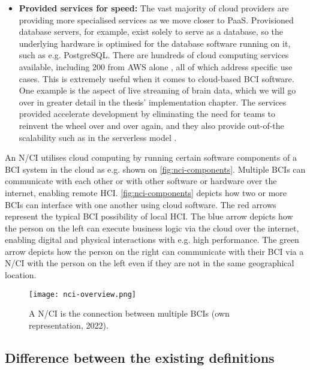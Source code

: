 \begin{itemize}
  \item \textbf{Provided services for speed:} The vast majority of cloud providers are providing more specialised services as we move closer to PaaS. Provisioned database servers, for example, exist solely to serve as a database, so the underlying hardware is optimised for the database software running on it, such as e.g. PostgreSQL. There are hundreds of cloud computing services available, including 200 from AWS alone \citep{amazon_web_services_inc_what_nodate}, all of which address specific use cases. This is extremely useful when it comes to cloud-based BCI software. One example is the aspect of live streaming of brain data, which we will go over in greater detail in the thesis' implementation chapter. The services provided accelerate development by eliminating the need for teams to reinvent the wheel over and over again, and they also provide out-of-the scalability such as in the serverless model \citep{redhat_what_2022}.
\end{itemize}

An N/CI utilises cloud computing by running certain software components of a BCI system in the cloud as e.g. shown on \autoref{fig:nci-components}. Multiple BCIs can communicate with each other or with other software or hardware over the internet, enabling remote HCI. \autoref{fig:nci-components} depicts how two or more BCIs can interface with one another using cloud software. The red arrows represent the typical BCI possibility of local HCI. The blue arrow depicts how the person on the left can execute business logic via the cloud over the internet, enabling digital and physical interactions with e.g. high performance. The green arrow depicts how the person on the right can communicate with their BCI via a N/CI with the person on the left even if they are not in the same geographical location.

\begin{figure}[!ht]
  \centering
  \texttt{[image: nci-overview.png]}
  \caption{A N/CI is the connection between multiple BCIs (own representation, 2022).}
  \label{fig:nci-overview}
\end{figure}

\subsection{Difference between the existing definitions}
\label{chapter2-difference-between-the-existing-definitions}


